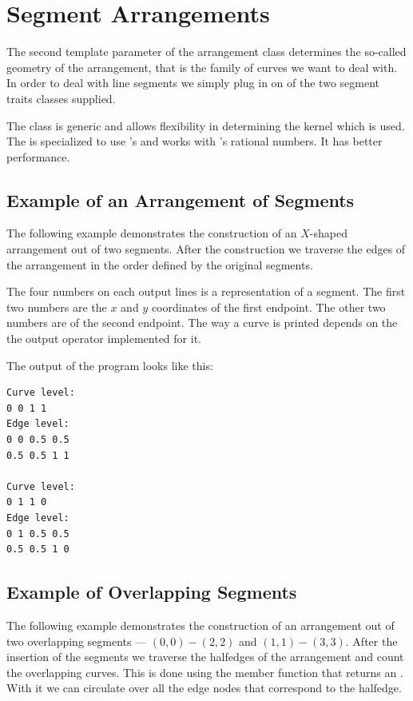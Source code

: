 


\section{Segment Arrangements}

The second template parameter of the arrangement class determines the
so-called geometry of the arrangement, that is the family of curves we
want to deal with. In order to deal with line segments we simply plug
in on of the two segment traits classes supplied.

The  class is generic and allows
flexibility in determining the kernel which is used. The
 is specialized to use \leda\/'s
 and works with \leda\/'s rational
numbers. It has better performance.

\subsection{Example of an Arrangement of Segments}
The following example demonstrates the construction of an $X$-shaped
arrangement out of two segments.  After the construction we traverse
the edges of the arrangement in the order defined by the original
segments.

The four numbers on each output lines is a representation of a segment.
The first two numbers are the $x$ and $y$ coordinates of the first endpoint.
The other two numbers are of the second endpoint. The way a curve is
printed depends on the the output operator implemented for it.


The output of the program looks like this:
\begin{verbatim}
Curve level:
0 0 1 1
Edge level:
0 0 0.5 0.5
0.5 0.5 1 1

Curve level:
0 1 1 0
Edge level:
0 1 0.5 0.5
0.5 0.5 1 0
\end{verbatim}

\subsection{Example of Overlapping Segments}
\label{ssec:example2}
The following example demonstrates the construction of an
arrangement out of two overlapping segments --- $(0,0)-(2,2)$
and $(1,1)-(3,3)$.
After the insertion of the segments we
traverse the halfedges
of the arrangement and count the overlapping curves.
This is done using the  member function that returns an
. With it we can circulate
over all the edge nodes that correspond to the halfedge.

